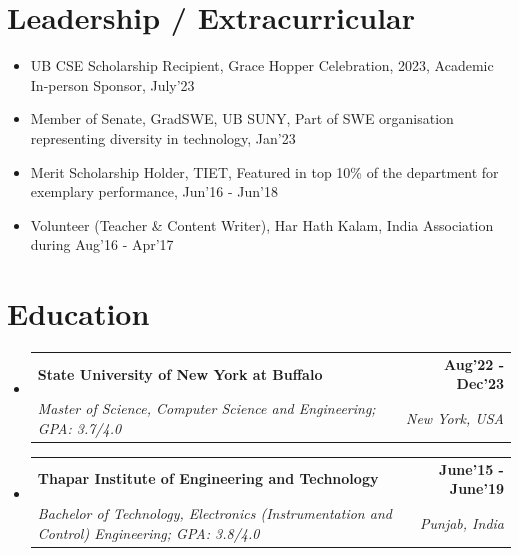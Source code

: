 \documentclass[letterpaper,11pt]{article}
\makeatletter
\newcommand{\resumeSubheading}[4]{
  \vspace{-2pt}\item
    \begin{tabular*}{1.0\textwidth}[t]{l@{\extracolsep{\fill}}r}
      \textbf{#1} & \textbf{\small #2} \\
      \textit{\small#3} & \textit{\small #4} \\
    \end{tabular*}\vspace{-7pt}
}
\newcommand{\resumeSubHeadingListStart}{\begin{itemize}[leftmargin=0.0in, label={}]}
\newcommand{\resumeSubHeadingListEnd}{\end{itemize}}
\makeatother
\begin{document}
\section{Leadership / Extracurricular}
\begin{itemize}
    \small
    \item UB CSE Scholarship Recipient, Grace Hopper Celebration, 2023, Academic In-person Sponsor, July'23
    \vspace{-7.5pt}
    \item Member of Senate, GradSWE, UB SUNY, Part of SWE organisation representing diversity in technology, Jan'23
    \vspace{-7.5pt}
    \item Merit Scholarship Holder, TIET, Featured in top 10\% of the department for exemplary performance, Jun'16 - Jun'18
    \vspace{-7.5pt}
    \item Volunteer (Teacher \& Content Writer), Har Hath Kalam, India Association during Aug'16 - Apr'17
\end{itemize}
\vspace{-12pt}
\section{Education}
  \resumeSubHeadingListStart
    \resumeSubheading
      {State University of New York at Buffalo}{Aug'22 - Dec'23}
      {Master of Science, Computer Science and Engineering; GPA: 3.7/4.0} {New York, USA}
      \vspace{-3pt}
    \resumeSubheading
      {Thapar Institute of Engineering and Technology}{June'15 - June'19}
      {Bachelor of Technology, Electronics (Instrumentation and Control) Engineering; GPA: 3.8/4.0} {Punjab, India}
  \resumeSubHeadingListEnd
\end{document}
